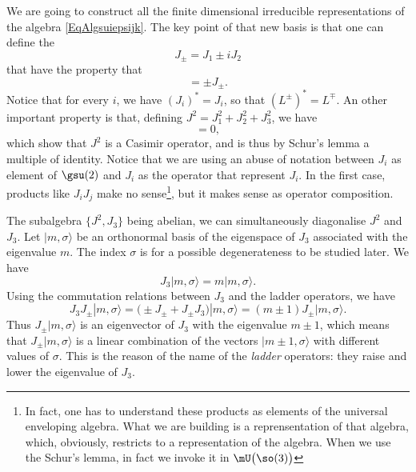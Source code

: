 We are going to construct all the finite dimensional irreducible representations of the algebra \eqref{EqAlgsuiepsijk}. The key point of that new basis is that one can define the 
\begin{equation}
    J_{\pm}=J_1\pm iJ_2
\end{equation}
that have the property that 
\begin{equation}
    [J_3,J_{\pm}]=\pm J_{\pm}.
\end{equation}
Notice that for every $i$, we have $(J_i)^*=J_i$, so that $(L^{\pm})^*=L^{\mp}$. An other important property is that, defining $J^2=J_1^2+J_2^2+J_3^2$, we have
\begin{equation}
    [J_i,J^2]=0,
\end{equation}
which show that $J^2$ is a Casimir operator, and is thus by Schur's lemma a multiple of identity. Notice that we are using an abuse of notation between $J_i$ as element of $\gsu(2)$ and $J_i$ as the operator that represent $J_i$. In the first case, products like $J_iJ_j$ make no sense\footnote{In fact, one has to understand these products as elements of the universal enveloping algebra. What we are building is a reprensentation of that algebra, which, obviously, restricts to a representation of the algebra. When we use the Schur's lemma, in fact we invoke it in $\mU\big(\so(3)\big)$}, but it makes sense as operator composition.

The subalgebra $\{ J^2,J_3 \}$ being abelian, we can simultaneously diagonalise $J^2$ and $J_3$. Let $| m,\sigma \rangle $ be an orthonormal basis of the eigenspace of $J_3$ associated with the eigenvalue $m$. The index $\sigma$ is for a possible degenerateness to be studied later.  We have
\[ 
    J_3| m,\sigma \rangle =m| m,\sigma \rangle .
\]
Using the commutation relations between $J_3$ and the ladder operators, we have
\begin{equation}        \label{EqJtroisJpmmplusun}
    J_3J_{\pm}| m,\sigma \rangle =\big( \pm J_{\pm}+J_{\pm}J_3 \big)| m,\sigma \rangle =(m\pm 1)J_{\pm}| m,\sigma \rangle .
\end{equation}
Thus $J_{\pm}| m,\sigma \rangle $ is an eigenvector of $J_3$ with the eigenvalue $m\pm 1$, which means that $J_{\pm}| m,\sigma \rangle $ is a linear combination of the vectors $| m\pm 1,\sigma \rangle $ with different values of $\sigma$. This is the reason of the name of the \emph{ladder} operators: they raise and lower the eigenvalue of $J_3$.

